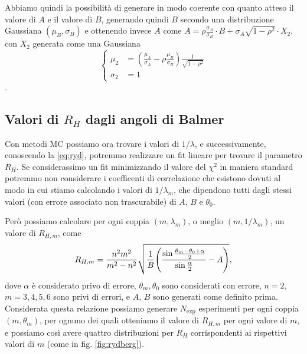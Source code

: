 \documentclass[a4paper,aps,12pt,tightenlines]{revtex4-2}
\begin{document}
Abbiamo quindi la possibilità di generare in modo coerente con quanto atteso il valore di $A$ e il valore di $B$, generando quindi $B$ secondo una distribuzione Gaussiana $(\mu_B, \sigma_B)$ e ottenendo invece $A$ come $A=\rho \frac{\sigma_A}{\sigma_B}\cdot B + \sigma_A \sqrt{1-\rho^2} \cdot X_2$, con $X_2$ generata come una Gaussiana \begin{equation}\left\{\begin{aligned}\mu_2 &= \left(\frac{\mu_A}{\sigma_A} - \rho\frac{\mu_B}{\sigma_B}\right)\frac{1}{\sqrt{1-\rho^2}}\\\sigma_2 &= 1\end{aligned}\right.\end{equation}.

\subsection{Valori di $R_H$ dagli angoli di Balmer}

Con metodi MC possiamo ora trovare i valori di $1/\lambda$, e successivamente, conoscendo la \eqref{eq:ryd}, potremmo realizzare un fit lineare per trovare il parametro $R_H$. Se considerassimo un fit minimizzando il valore del $\chi^2$ in maniera standard potremmo non considerare i coefficenti di correlazione che esistono dovuti al modo in cui stiamo calcolando i valori di $1/\lambda_m$, che dipendono tutti dagli stessi valori (con errore associato non trascurabile) di $A$, $B$ e $\theta_0$. 

Però possiamo calcolare per ogni coppia $(m, \lambda_m)$, o meglio $(m, 1/\lambda_m)$, un valore di $R_{H,m}$, come \begin{equation} 
    R_{H,m} = \frac{n^2m^2}{m^2-n^2}\sqrt{\frac{1}{B} \qty(\frac{\sin\frac{\theta_m-\theta_0 + \alpha}{2}}{\sin\frac{\alpha}{2}}-A)},
\end{equation} dove $\alpha$ è considerato privo di errore, $\theta_m, \theta_0$ sono considerati con errore, $n=2$, $m=3,4,5,6$ sono privi di errori, e $A$, $B$ sono generati come definito prima. Considerata questa relazione possiamo generare $N_\text{exp}$ esperimenti per ogni coppia $(m, \theta_m)$, per ognuno dei quali otteniamo il valore di $R_{H,m}$ per ogni valore di $m$, e possiamo così avere quattro distribuzioni per $R_H$ corrispondenti ai rispettivi valori di $m$ (come in fig. \ref{fig:rydberg}). 
\end{document}
